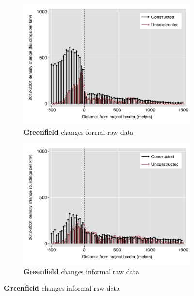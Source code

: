 \documentclass[12pt]{article}
\begin{document}
\begin{figure}
        \centering
       
        \begin{subfigure}[b]{0.48\textwidth}
                    \caption[Network2]%
            {{\footnotesize \textbf{Greenfield} changes formal  raw data}}    
            \label{fig:prefor}
            \centering
            \includegraphics[width=\textwidth,trim={0.3cm .3cm 0.1cm 0cm}, clip=true]{figures/bblu_for_rawchanges_4_1_spk.pdf}

        \end{subfigure}
        \hfill
        \begin{subfigure}[b]{0.48\textwidth}  
                    \caption[]%
            {{\footnotesize \textbf{Greenfield} changes informal raw data }}     
            \label{fig:preinf}
            \centering 
            \includegraphics[width=\textwidth,trim={0.3cm .3cm 0.1cm 0cm}, clip=true]{figures/bblu_inf_rawchanges_4_1_spk.pdf}


\end{subfigure}
\end{figure}
\end{document}
